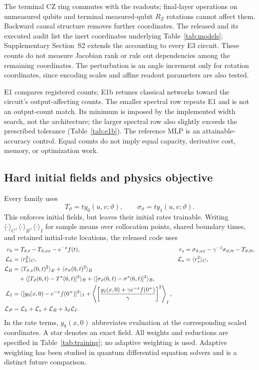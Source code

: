 \documentclass[11pt]{article}
\begin{document}
The terminal CZ ring commutes with the readouts; final-layer operations
on unmeasured qubits and terminal measured-qubit $R_Z$ rotations cannot
affect them. Backward causal structure removes further coordinates.
The released  and its executed audit list the
inert coordinates underlying Table~\ref{tab:models}; Supplementary
Section~S2 extends the accounting to every E3 circuit. These counts do not
measure Jacobian rank or rule out dependencies among the remaining
coordinates. The perturbation is an angle increment only for rotation
coordinates, since encoding scales and affine readout parameters are also
tested.

E1 compares registered counts; E1b retunes classical networks toward the
circuit's output-affecting counts. The smaller spectral row repeats E1
and is not an output-count match. Its minimum is imposed by the implemented
width search, not the architecture; the larger spectral row also slightly
exceeds the prescribed tolerance (Table~\ref{tab:e1b}). The reference MLP
is an attainable-accuracy control. Equal counts do not imply equal
capacity, derivative cost, memory, or optimization work.

\subsection{Hard initial fields and physics objective}

Every family uses
\begin{equation}
 T_\vartheta=t y_0(u,v;\vartheta),\qquad
 \sigma_\vartheta=t y_1(u,v;\vartheta).
 \label{eq:ansatz}
\end{equation}
This enforces initial fields, but leaves their initial rates trainable.
Writing $\langle\cdot\rangle_C,\langle\cdot\rangle_B,
\langle\cdot\rangle_I$ for sample means over collocation points, shared
boundary times, and retained initial-rate locations, the released code uses
\begin{align}
 r_h&=T_{\vartheta,t}-T_{\vartheta,xx}-e^{-x}f(t),&
 r_s&=\sigma_{\vartheta,xx}-\gamma^{-1}\sigma_{\vartheta,tt}
       -T_{\vartheta,tt},\\
 \mathcal L_h&=\langle r_h^2\rangle_C,&
 \mathcal L_s&=\langle r_s^2\rangle_C,\\
 \mathcal L_B&=\langle T_{\vartheta,x}(0,t)^2\rangle_B
 +\langle\sigma_\vartheta(0,t)^2\rangle_B\notag\\
 &\quad+\langle[T_\vartheta(6,t)-T^*(6,t)]^2\rangle_B
 +\langle[\sigma_\vartheta(6,t)-\sigma^*(6,t)]^2\rangle_B,\\
 \mathcal L_I&=\langle[y_0(x,0)-e^{-x}f(0^+)]^2\rangle_I
 +\left\langle\left[\frac{y_1(x,0)+\gamma e^{-x}f(0^+)}\gamma
 \right]^2\right\rangle_I,\\
 \mathcal L_P&=\mathcal L_h+\mathcal L_s+\mathcal L_B
 +\lambda_I\mathcal L_I.\label{eq:loss}
\end{align}
In the rate terms, $y_k(x,0)$ abbreviates evaluation at the corresponding
scaled coordinates. A star denotes an exact field. All weights and
reductions are specified in Table~\ref{tab:training}; no adaptive weighting
is used. Adaptive weighting has been studied in quantum differential
equation solvers \citep{Setty2025} and is a distinct future comparison.
\end{document}
